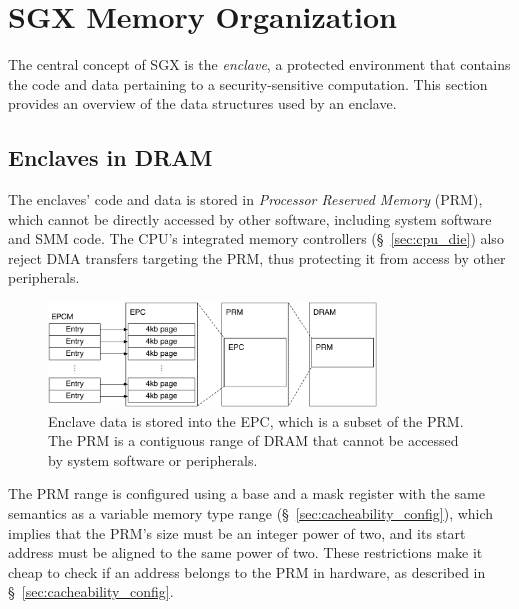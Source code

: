 \section{SGX Memory Organization}
\label{sec:memory}

The central concept of SGX is the \textit{enclave}, a protected environment
that contains the code and data pertaining to a security-sensitive computation.
This section provides an overview of the data structures used by an enclave.


\subsection{Enclaves in DRAM}
\label{sec:prm}


The enclaves' code and data is stored in \textit{Processor Reserved Memory}
(PRM), which cannot be directly accessed by other software, including system
software and SMM code. The CPU's integrated memory controllers
(\S~\ref{sec:cpu_die}) also reject DMA transfers targeting the PRM, thus
protecting it from access by other peripherals.

\begin{figure}[hbt]
  \centering
  \includegraphics[width=87mm]{figures/sgx_epc.pdf}
  \caption{
    Enclave data is stored into the EPC, which is a subset of the PRM. The
    PRM is a contiguous range of DRAM that cannot be accessed by system
    software or peripherals.
  }
  \label{fig:sgx_epc}
\end{figure}

The PRM range is configured using a base and a mask register with the same
semantics as a variable memory type range (\S~\ref{sec:cacheability_config}),
which implies that the PRM's size must be an integer power of two, and its
start address must be aligned to the same power of two. These restrictions make
it cheap to check if an address belongs to the PRM in hardware, as described in
\S~\ref{sec:cacheability_config}.


